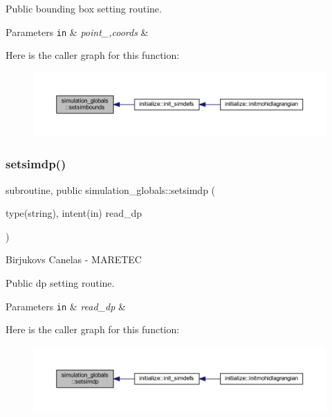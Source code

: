 Public bounding box setting routine. 
\begin{DoxyParams}[1]{Parameters}
\mbox{\tt in}  & {\em point\+\_\+,coords} & \\
\hline
\end{DoxyParams}
Here is the caller graph for this function\+:
\nopagebreak
\begin{figure}[H]
\begin{center}
\leavevmode
\includegraphics[width=350pt]{namespacesimulation__globals_a8e4aaa3352a4aa807b5cdf0a537c13e8_icgraph}
\end{center}
\end{figure}
\mbox{\label{namespacesimulation__globals_a279b7a2988da04ca81146f0a8f154ca9}} 
\subsubsection{\texorpdfstring{setsimdp()}{setsimdp()}}
{\footnotesize\ttfamily subroutine, public simulation\+\_\+globals\+::setsimdp (\begin{DoxyParamCaption}\item[{type(string), intent(in)}]{read\+\_\+dp }\end{DoxyParamCaption})}



Birjukovs Canelas -\/ M\+A\+R\+E\+T\+EC 

Public dp setting routine. 
\begin{DoxyParams}[1]{Parameters}
\mbox{\tt in}  & {\em read\+\_\+dp} & \\
\hline
\end{DoxyParams}
Here is the caller graph for this function\+:
\nopagebreak
\begin{figure}[H]
\begin{center}
\leavevmode
\includegraphics[width=350pt]{namespacesimulation__globals_a279b7a2988da04ca81146f0a8f154ca9_icgraph}
\end{center}
\end{figure}
\mbox{\label{namespacesimulation__globals_abe9252e2e73b8a074700d49b705664ef}} 
